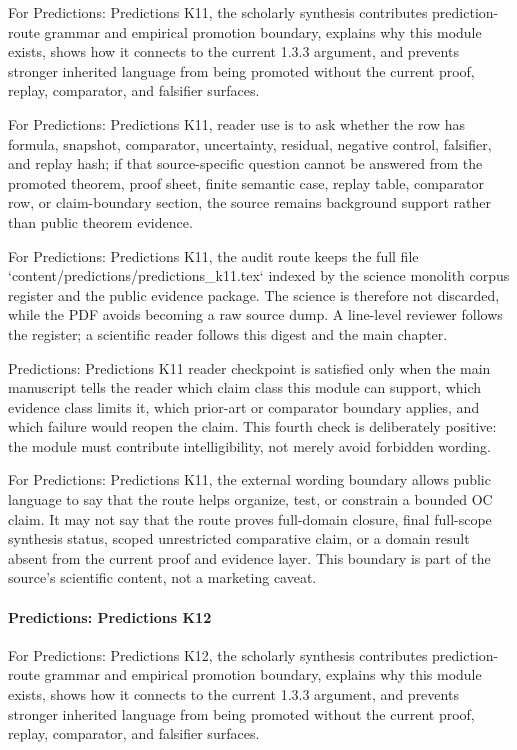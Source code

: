 For Predictions: Predictions K11, the scholarly synthesis contributes prediction-route grammar and empirical promotion boundary, explains why this module exists, shows how it connects to the current 1.3.3 argument, and prevents stronger inherited language from being promoted without the current proof, replay, comparator, and falsifier surfaces.


For Predictions: Predictions K11, reader use is to ask whether the row has formula, snapshot, comparator, uncertainty, residual, negative control, falsifier, and replay hash; if that source-specific question cannot be answered from the promoted theorem, proof sheet, finite semantic case, replay table, comparator row, or claim-boundary section, the source remains background support rather than public theorem evidence.


For Predictions: Predictions K11, the audit route keeps the full file `content/predictions/predictions\_k11.tex` indexed by the science monolith corpus register and the public evidence package. The science is therefore not discarded, while the PDF avoids becoming a raw source dump. A line-level reviewer follows the register; a scientific reader follows this digest and the main chapter.


Predictions: Predictions K11 reader checkpoint is satisfied only when the main manuscript tells the reader which claim class this module can support, which evidence class limits it, which prior-art or comparator boundary applies, and which failure would reopen the claim. This fourth check is deliberately positive: the module must contribute intelligibility, not merely avoid forbidden wording.


For Predictions: Predictions K11, the external wording boundary allows public language to say that the route helps organize, test, or constrain a bounded OC claim. It may not say that the route proves full-domain closure, final full-scope synthesis status, scoped unrestricted comparative claim, or a domain result absent from the current proof and evidence layer. This boundary is part of the source's scientific content, not a marketing caveat.


\paragraph{Predictions: Predictions K12}

For Predictions: Predictions K12, the scholarly synthesis contributes prediction-route grammar and empirical promotion boundary, explains why this module exists, shows how it connects to the current 1.3.3 argument, and prevents stronger inherited language from being promoted without the current proof, replay, comparator, and falsifier surfaces.


